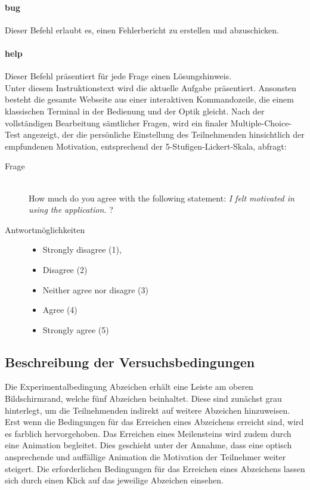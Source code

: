 \paragraph{bug}
Dieser Befehl erlaubt es, einen Fehlerbericht zu erstellen und abzuschicken.

\paragraph{help}
Dieser Befehl präsentiert für jede Frage einen Lösungshinweis. \\

Unter diesem Instruktionstext wird die aktuelle Aufgabe präsentiert. Ansonsten besteht die gesamte Webseite aus einer interaktiven Kommandozeile, die einem klassischen Terminal in der Bedienung und der Optik gleicht. Nach der vollständigen Bearbeitung sämtlicher Fragen, wird ein finaler Multiple-Choice-Test angezeigt, der die persönliche Einstellung des Teilnehmenden hinsichtlich der empfundenen Motivation, entsprechend der 5-Stufigen-Lickert-Skala, abfragt:

\begin{description}
\item[Frage]\hfill \\ How much do you agree with the following statement: \textit{I felt motivated in using the application.} ?
\item[Antwortmöglichkeiten]\hfill 


\begin{itemize}
	 \item Strongly disagree (1),
	 \item Disagree (2)
	 \item Neither agree nor disagre (3)
	 \item Agree (4)
	 \item Strongly agree (5)
\end{itemize}
\end{description}


\subsection{Beschreibung der Versuchsbedingungen}
Die Experimentalbedingung Abzeichen erhält eine Leiste am oberen Bildschirmrand, welche fünf Abzeichen beinhaltet. Diese sind zunächst grau hinterlegt, um die Teilnehmenden indirekt auf weitere Abzeichen hinzuweisen. Erst wenn die Bedingungen für das Erreichen eines Abzeichens erreicht sind, wird es farblich hervorgehoben. Das Erreichen eines Meilensteins wird zudem durch eine Animation begleitet. Dies geschieht unter der Annahme, dass eine optisch ansprechende und auffällige Animation die Motivation der Teilnehmer weiter steigert. Die erforderlichen Bedingungen für das Erreichen eines Abzeichens lassen sich durch einen Klick auf das jeweilige Abzeichen einsehen.

